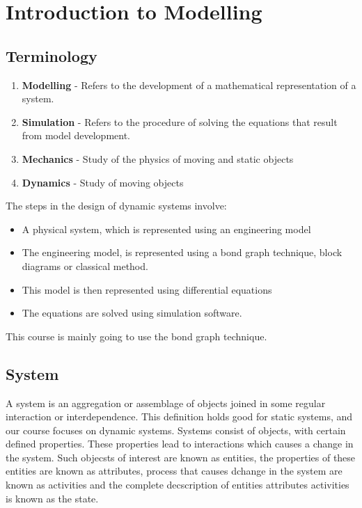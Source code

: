 \documentclass[11pt]{report}
\begin{document}
\chapter{Introduction to Modelling}
\label{sec:orge45cbf0}
\section{Terminology}
\label{sec:orgd4247d7}
\begin{enumerate}
\item \textbf{Modelling} - Refers to the development of a mathematical
representation of a system.

\item \textbf{Simulation} - Refers to the procedure of solving the equations that
result from model development.

\item \textbf{Mechanics} - Study of the physics of moving and static objects

\item \textbf{Dynamics} - Study of moving objects
\end{enumerate}

The steps in the design of dynamic systems involve:

\begin{itemize}
\item A physical system, which is represented using an engineering model

\item The engineering model, is represented using a bond graph technique,
block diagrams or classical method.

\item This model is then represented using differential equations

\item The equations are solved using simulation software.
\end{itemize}

This course is mainly going to use the bond graph technique.
\section{System}
\label{system}
A system is an aggregation or assemblage of objects joined in some
regular interaction or interdependence. This definition holds good for
static systems, and our course focuses on dynamic systems. Systems
consist of objects, with certain defined properties. These properties
lead to interactions which causes a change in the system. Such objecsts
of interest are known as entities, the properties of these entities are
known as attributes, process that causes dchange in the system are known
as activities and the complete decscription of entities attributes
activities is known as the state.
\end{document}
